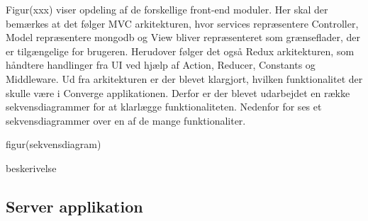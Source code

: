 Figur(xxx) viser opdeling af de forskellige front-end moduler. Her skal der bemærkes at det følger MVC arkitekturen, hvor services repræsentere Controller, Model repræsentere mongodb og View bliver repræsenteret som grænseflader, der er tilgængelige for brugeren. Herudover følger det også Redux arkitekturen, som håndtere handlinger fra UI ved hjælp af Action, Reducer, Constants og Middleware.    
Ud fra arkitekturen er der blevet klargjort, hvilken funktionalitet der skulle være i Converge applikationen. Derfor er der blevet udarbejdet en række sekvensdiagrammer for at klarlægge funktionaliteten. Nedenfor for ses et sekvensdiagrammer over en af de mange funktionaliter.

figur(sekvensdiagram)

beskerivelse

\subsection{Server applikation}